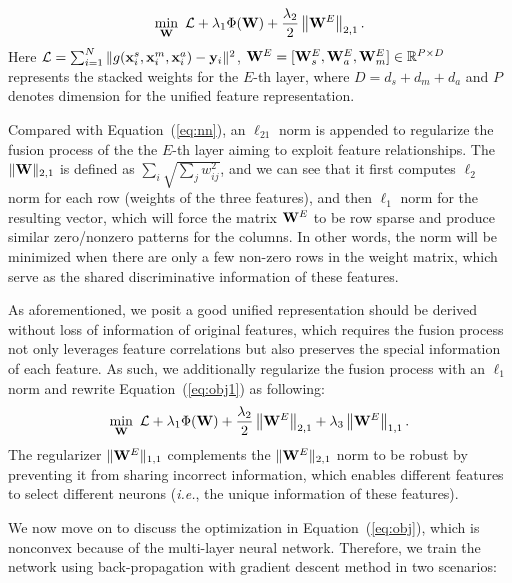 \documentclass[journal]{IEEEtran}
\makeatletter
\newcommand*{\ie}{\emph{i.e.}\@\xspace}
\makeatother
\begin{document}
\begin{equation}
\label{eq:obj1}
  \min_{{\bf W}}~\mathcal{L} + \lambda_1 \Phi({\bf W})
+\frac{\lambda_{2}}{2}\left \| {\bf W}^{E} \right \|_{2,1}.
\end{equation}
Here $\mathcal{L} =  \sum_{i=1}^{N} \|  g({\bf x}_{i}^{s},{\bf x}_{i}^{m}, {\bf x}_{i}^{a})-{\bf y}_i \|^2$,  ${\bf W}^E = [{\bf W}^{E}_{s},  {\bf W}^{E}_{a}, {\bf W}^{E}_{m}] \in \mathbb{R}^{P \times D}$ represents the stacked weights for the $E$-th layer, where $D = d_s + d_m + d_a$ and $P$ denotes dimension for the unified feature representation. 

Compared with Equation~(\ref{eq:nn}), an $\ell_{21}$ norm is appended to regularize the fusion process of the the $E$-th layer aiming to exploit feature relationships. The $\|{\bf W}\|_{2,1}$ is defined as $\sum_i \sqrt{\sum_j w_{ij}^2}$, and we can see that it first computes $\ell_2$ norm for each row (weights of the three features), and then $\ell_1$ norm for the resulting vector, which will force the matrix ${\bf W}^E$ to be row sparse and produce similar zero/nonzero patterns for the columns. 
In other words, the norm will be minimized when there are only a few non-zero rows in the weight matrix, which serve as the shared discriminative information of these features.

As aforementioned, we posit a good unified representation should be derived without loss of information of original features, which requires the fusion process not only leverages feature correlations but also preserves the special information of each feature. As such, we additionally regularize the fusion process with an $\ell_1$ norm and rewrite Equation~(\ref{eq:obj1}) as following:
\begin{equation}
\label{eq:obj}
  \min_{{\bf W}}~\mathcal{L} + \lambda_1 \Phi({\bf W}) +\frac{\lambda_{2}}{2}\left \| {\bf W}^{E} \right \|_{2,1} + \lambda_{3}\left \| {\bf W}^{E} \right \|_{1,1}.
\end{equation}
The regularizer $\|{\bf W}^E\|_{1,1}$ complements the $\|{\bf W}^E\|_{2,1}$ norm to be robust by preventing it from sharing incorrect information, which enables different features to select different neurons (\ie, the unique information of these features).

We now move on to discuss the optimization in Equation~(\ref{eq:obj}), which is nonconvex because of the multi-layer neural network. Therefore, we train the network using back-propagation with gradient descent method in two scenarios:
\end{document}
